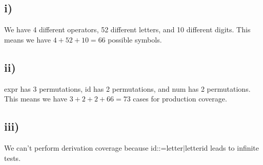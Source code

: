 \documentclass[12pt, letterpaper, titlepage]{article}
\begin{document}
\subsection*{i)}
We have 4 different operators, 52 different letters, and 10 different digits. This means we have $4 + 52 + 10 = 66$ possible symbols. 

\subsection*{ii)}
\textlangle{}expr\textrangle{} has 3 permutations, \textlangle{}id\textrangle{} has 2 permutations, and \textlangle{}num\textrangle{} has 2 permutations. This means we have $3 + 2 + 2 + 66 = 73$ cases for production coverage.

\subsection*{iii)}
We can't perform derivation coverage because \textlangle{}id\textrangle{}::=\textlangle{}letter\textrangle{}$|$\textlangle{}letter\textrangle{}\textlangle{}id\textrangle{} leads to infinite tests.
\end{document}
